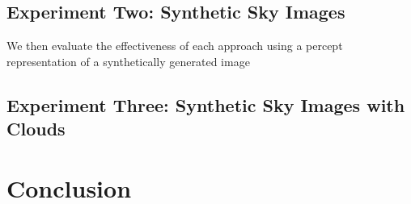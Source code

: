 \documentclass[11pt]{article}
\begin{document}
\subsection{Experiment Two: Synthetic Sky Images}

We then evaluate the effectiveness of each approach using a percept representation of a synthetically generated image

\subsection{Experiment Three: Synthetic Sky Images with Clouds}




\section{Conclusion}


















\end{document}
